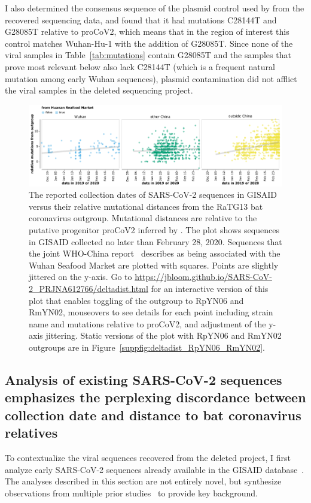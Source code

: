 \documentclass[9pt,twocolumn,twoside]{gsajnl_modified}
\begin{document}
I also determined the consensus sequence of the plasmid control used by \citet{wang2020medRxiv} from the recovered sequencing data, and found that it had mutations C28144T and G28085T relative to proCoV2, which means that in the region of interest this control matches Wuhan-Hu-1 with the addition of G28085T.
Since none of the viral samples in Table~\ref{tab:mutations} contain G28085T and the samples that prove most relevant below also lack C28144T (which is a frequent natural mutation among early Wuhan sequences), plasmid contamination did not afflict the viral samples in the deleted sequencing project.

\begin{figure}
\centering
\includegraphics[width=\linewidth]{figures/deltadist_RaTG13.pdf}
\caption{The reported collection dates of SARS-CoV-2 sequences in GISAID versus their relative mutational distances from the RaTG13 bat coronavirus outgroup.
Mutational distances are relative to the putative progenitor proCoV2 inferred by \citet{kumar2021evolutionary}.
The plot shows sequences in GISAID collected no later than February 28, 2020.
Sequences that the joint WHO-China report~\citep{WHO2021origins} describes as being associated with the Wuhan Seafood Market are plotted with squares.
Points are slightly jittered on the y-axis.
Go to \url{https://jbloom.github.io/SARS-CoV-2_PRJNA612766/deltadist.html} for an interactive version of this plot that enables toggling of the outgroup to RpYN06 and RmYN02, mouseovers to see details for each point including strain name and mutations relative to proCoV2, and adjustment of the y-axis jittering.
Static versions of the plot with RpYN06 and RmYN02 outgroups are in Figure~\ref{suppfig:deltadist_RpYN06_RmYN02}.
}
\label{fig:deltadist_RaTG13}
\end{figure}

\subsection{Analysis of existing SARS-CoV-2 sequences emphasizes the perplexing discordance between collection date and distance to bat coronavirus relatives}
To contextualize the viral sequences recovered from the deleted project, I first analyze early SARS-CoV-2 sequences already available in the GISAID database~\citep{shu2017gisaid}.
The analyses described in this section are not entirely novel, but synthesize observations from multiple prior studies~\citep{kumar2021evolutionary,pekar2021timing,rambaut2020dynamic,forster2020phylogenetic,pipes2021assessing} to provide key background.
\end{document}
